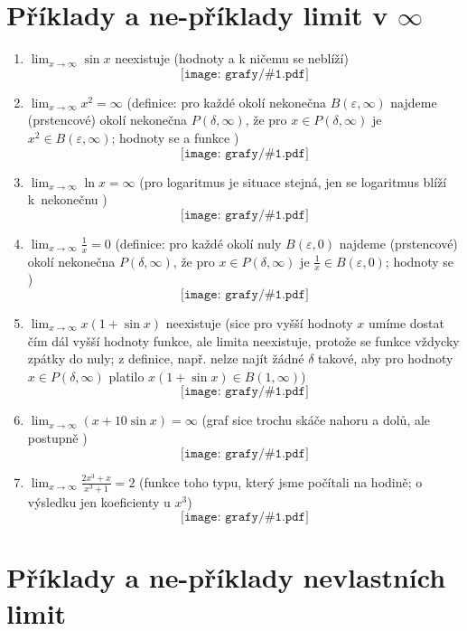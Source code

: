\documentclass[12pt,a4paper]{article}
\def\graf#1{\[\texttt{[image: grafy/\#1.pdf]}\]\par\vfil}
\begin{document}
\section*{Příklady a ne-příklady limit v $\infty$}

\everymath{\displaystyle}

\begin{enumerate}
	\item $\lim_{x \to \infty} \sin x$ neexistuje (hodnoty  a k ničemu se neblíží) \graf{sin}
	\item $\lim_{x \to \infty} x^2 = \infty$ (definice: pro každé okolí nekonečna $B(\varepsilon, \infty)$ najdeme (prstencové) okolí nekonečna $P(\delta, \infty)$, že pro $x \in P(\delta, \infty)$ je $x^2 \in B(\varepsilon, \infty)$; hodnoty se  a funkce ) \graf{kvadr}
	\item $\lim_{x \to \infty} \operatorname{ln}x = \infty$ (pro logaritmus je situace stejná, jen se logaritmus blíží k~nekonečnu ) \graf{ln}
	\item $\lim_{x \to \infty}\tfrac1x = 0$ (definice: pro každé okolí nuly $B(\varepsilon, 0)$ najdeme (prstencové) okolí nekonečna $P(\delta, \infty)$, že pro $x \in P(\delta, \infty)$ je $\tfrac1x \in B(\varepsilon, 0)$; hodnoty se ) \graf{inv}
	\item $\lim_{x \to \infty}x(1+\sin x)$ neexistuje (sice pro vyšší hodnoty $x$ umíme dostat čím dál vyšší hodnoty funkce, ale limita neexistuje, protože se funkce vždycky  zpátky do nuly; z definice, např. nelze najít žádné $\delta$ takové, aby pro hodnoty $x \in P(\delta, \infty)$ platilo $x(1+\sin x) \in B(1,\infty)$) \graf{xsin}
	\item $\lim_{x \to \infty}(x + 10\sin x) = \infty$ (graf sice trochu skáče nahoru a dolů, ale postupně ) \graf{sinplus}
	\item $\lim_{x \to \infty} \tfrac{2x^3 + x}{x^3 + 1} = 2$ (funkce toho typu, který jsme počítali na hodině; o výsledku  jen koeficienty u $x^3$) \graf{rational}
\end{enumerate}


\section*{Příklady a ne-příklady nevlastních limit}
\end{document}
